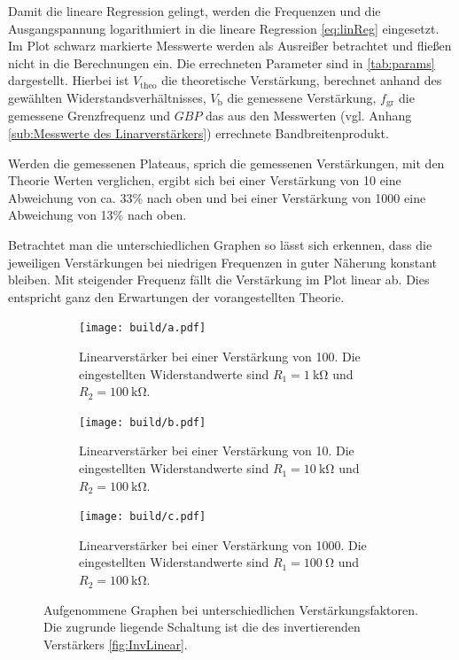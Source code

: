 Damit die lineare Regression gelingt, werden die Frequenzen und die Ausgangspannung logarithmiert in die
lineare Regression \autoref{eq:linReg} eingesetzt.
Im Plot schwarz markierte Messwerte werden als Ausreißer betrachtet 
und fließen nicht in die Berechnungen ein.
Die errechneten Parameter sind in \autoref{tab:params} dargestellt.
Hierbei ist $V_\text{theo}$ die theoretische Verstärkung, berechnet anhand des gewählten 
Widerstandsverhältnisses, $V_\text{b}$ die gemessene Verstärkung, $f_\text{gr}$ die 
gemessene Grenzfrequenz und $GBP$ das aus den Messwerten 
(vgl. Anhang \ref{sub:Messwerte des Linarverstärkers}) errechnete Bandbreitenprodukt.

\FloatBarrier
Werden die gemessenen Plateaus, sprich die gemessenen Verstärkungen, mit den Theorie
Werten verglichen, ergibt sich bei einer Verstärkung von 10 eine Abweichung von ca. 33\% nach oben
und bei einer Verstärkung von 1000 eine Abweichung von 13\% nach oben.

Betrachtet man die unterschiedlichen Graphen so lässt sich erkennen, dass
die jeweiligen Verstärkungen bei niedrigen Frequenzen in guter Näherung konstant
bleiben. Mit steigender Frequenz fällt die Verstärkung im Plot linear ab.
Dies entspricht ganz den Erwartungen der vorangestellten Theorie.
\begin{figure}
    \centering
    \begin{subfigure}[b]{0.45\textwidth}
        \centering
        \texttt{[image: build/a.pdf]}
        \caption{Linearverstärker bei einer Verstärkung von 100.
        Die eingestellten Widerstandwerte sind $R_1 = \SI{1}{\kilo\ohm}$ und $R_2 = \SI{100}{\kilo\ohm}$. }
        \label{fig:a}
    \end{subfigure}
    \hfill
    \begin{subfigure}[b]{0.45\textwidth}
        \centering
        \texttt{[image: build/b.pdf]}
        \caption{Linearverstärker bei einer Verstärkung von 10. 
        Die eingestellten Widerstandwerte sind $R_1 = \SI{10}{\kilo\ohm}$ und $R_2 = \SI{100}{\kilo\ohm}$. }
        \label{fig:b}
    \end{subfigure}
    \newline
    \newline    
    \newline    
    \newline    
    \begin{subfigure}[b]{0.45\textwidth}
        \centering
        \texttt{[image: build/c.pdf]}
        \caption{Linearverstärker bei einer Verstärkung von 1000. 
        Die eingestellten Widerstandwerte sind $R_1 = \SI{100}{\ohm}$ und $R_2 = \SI{100}{\kilo\ohm}$. }
        \label{fig:c}
    \end{subfigure}
       \caption{Aufgenommene Graphen bei unterschiedlichen Verstärkungsfaktoren. Die zugrunde liegende 
       Schaltung ist die des invertierenden Verstärkers \autoref{fig:InvLinear}.}
       \label{fig:Linearverstaerker}
\end{figure}
\FloatBarrier

